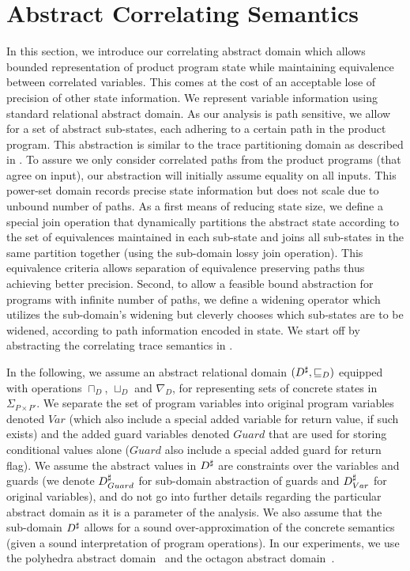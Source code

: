 \section{Abstract Correlating Semantics}

In this section, we introduce our correlating abstract domain which allows bounded representation of product program state while maintaining equivalence between correlated variables. This comes at the cost of an acceptable lose of precision of other state information. We represent variable information using standard relational abstract domain. As our analysis is path sensitive, we allow for a set of abstract sub-states, each adhering to a certain path in the product program. This abstraction is similar to the trace partitioning domain as described in \cite{MauborgneRival07}. To assure we only consider correlated paths from the product programs (that agree on input), our abstraction will initially assume equality on all inputs. This power-set domain records precise state information but does not scale due to unbound number of paths. As a first means of reducing state size, we define a special join operation that dynamically partitions the abstract state according to the set of equivalences maintained in each sub-state and joins all sub-states in the same partition together (using the sub-domain lossy join operation). This equivalence criteria allows separation of equivalence preserving paths thus achieving better precision. Second, to allow a feasible bound abstraction for programs with infinite number of paths, we define a widening operator which utilizes the sub-domain's widening but cleverly chooses which sub-states are to be widened, according to path information encoded in state.
We start off by abstracting the correlating trace semantics in .

In the following, we assume an abstract relational domain $(D^\sharp, \sqsubseteq_{D})$ equipped with operations $\sqcap_{D}$, $\sqcup_{D}$ and $\nabla_{D}$, for representing sets of concrete states in $\Sigma_{P \times P'}$. We separate the set of program variables into original program variables denoted $Var$ (which also include a special added variable for return value, if such exists) and the added guard variables denoted $Guard$ that are used for storing conditional values alone ($Guard$ also include a special added guard for return flag). We assume the abstract values in $D^\sharp$ are constraints over the variables and guards (we denote $D^\sharp_{Guard}$ for sub-domain abstraction of guards and $D^\sharp_{Var}$ for original variables), and do not go into further details regarding the particular abstract domain as it is a parameter of the analysis. We also assume that the sub-domain $D^\sharp$ allows for a sound over-approximation of the concrete semantics (given a sound interpretation of program operations). In our experiments, we use the polyhedra abstract domain~\cite{CousotHalbwachs78} and the octagon abstract domain~\cite{Mine07}.

